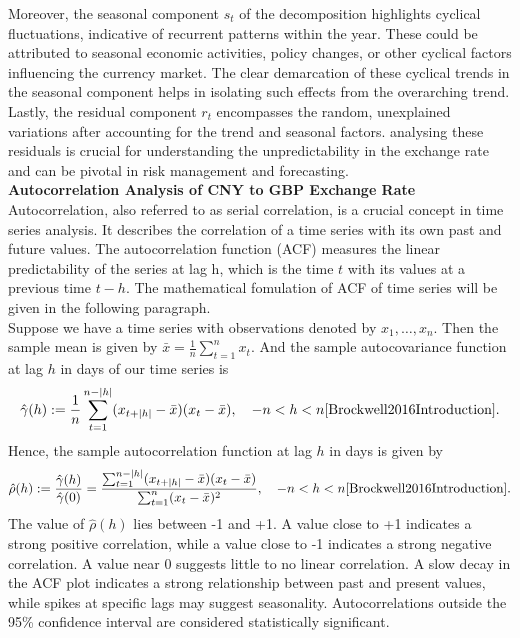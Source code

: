 \documentclass{article}\usepackage[]{graphicx}\usepackage[]{xcolor}
\numberwithin{equation}{section}
\begin{document}
\noindent
Moreover, the seasonal component $s_t$ of the decomposition highlights cyclical fluctuations, indicative of recurrent patterns within the year. These could be attributed to seasonal economic activities, policy changes, or other cyclical factors influencing the currency market. The clear demarcation of these cyclical trends in the seasonal component helps in isolating such effects from the overarching trend.\\

\noindent
Lastly, the residual component $r_t$ encompasses the random, unexplained variations after accounting for the trend and seasonal factors. analysing these residuals is crucial for understanding the unpredictability in the exchange rate and can be pivotal in risk management and forecasting.\\

\noindent
\textbf{Autocorrelation Analysis of CNY to GBP Exchange Rate}\\
\noindent
Autocorrelation, also referred to as serial correlation, is a crucial concept in time series analysis. It describes the correlation of a time series with its own past and future values. The autocorrelation function (ACF) measures the linear predictability of the series at lag h, which is the time $t$ with its values at a previous time $t-h$. The mathematical fomulation of ACF of time series will be given in the following paragraph.\\

\noindent
Suppose we have a time series with observations denoted by \( x_1, \ldots, x_n \). Then the sample mean is given by $\bar{x} = \frac{1}{n} \sum_{t=1}^{n} x_t.$
And the sample autocovariance function at lag $h$ in days of our time series is
\[\hat{\gamma}(h) := \frac{1}{n} \sum_{t=1}^{n-|h|} (x_{t+|h|} - \bar{x})(x_t - \bar{x}), \quad -n < h < n \cite{Brockwell2016Introduction}.\]
Hence, the sample autocorrelation function at lag $h$ in days is given by
\[\hat{\rho}(h) := \frac{\hat{\gamma}(h)}{\hat{\gamma}(0)} = \frac{\sum_{t=1}^{n-|h|} (x_{t+|h|} - \bar{x})(x_t - \bar{x})}{\sum_{t=1}^{n} (x_t - \bar{x})^{2}}, \quad -n < h < n \cite{Brockwell2016Introduction}.\]
\noindent
The value of $\hat{\rho}(h)$ lies between -1 and +1. A value close to +1 indicates a strong positive correlation, while a value close to -1 indicates a strong negative correlation. A value near 0 suggests little to no linear correlation. A slow decay in the ACF plot indicates a strong relationship between past and present values, while spikes at specific lags may suggest seasonality. Autocorrelations outside the 95\% confidence interval are considered statistically significant.\\
\end{document}
